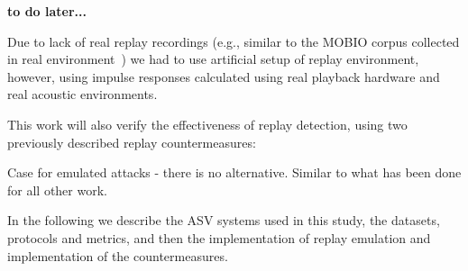 
{\bfseries to do later...}

Due to lack of real replay recordings (e.g., similar to the MOBIO corpus collected in real environment~\cite{Khoury2013a}) we had to use artificial setup of replay environment, however, using impulse responses calculated using real playback hardware and real acoustic environments. 

This work will also verify the effectiveness of replay detection, using two previously described replay countermeasures: 

Case for emulated attacks - there is no alternative.  Similar to what has been done for all other work.

In the following we describe the ASV systems used in this study, the datasets, protocols and metrics, and then the implementation of replay emulation and implementation of the countermeasures.
